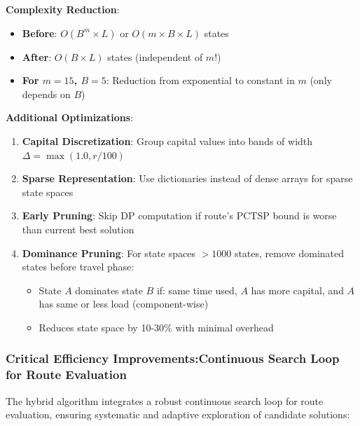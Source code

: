 \documentclass[12pt]{article}
\begin{document}
\textbf{Complexity Reduction}:
\begin{itemize}
    \item \textbf{Before}: $O(B^m \times L)$ or $O(m \times B \times L)$ states
    \item \textbf{After}: $O(B \times L)$ states (independent of $m$!)
    \item \textbf{For $m=15$, $B=5$}: Reduction from exponential to constant in $m$ (only depends on $B$)
\end{itemize}

\textbf{Additional Optimizations}:
\begin{enumerate}
    \item \textbf{Capital Discretization}: Group capital values into bands of width $\Delta = \max(1.0, r / 100)$
    \item \textbf{Sparse Representation}: Use dictionaries instead of dense arrays for sparse state spaces
    \item \textbf{Early Pruning}: Skip DP computation if route's PCTSP bound is worse than current best solution
    \item \textbf{Dominance Pruning}: For state spaces $> 1000$ states, remove dominated states before travel phase:
    \begin{itemize}
        \item State $A$ dominates state $B$ if: same time used, $A$ has more capital, and $A$ has same or less load (component-wise)
        \item Reduces state space by 10-30\% with minimal overhead
    \end{itemize}
\end{enumerate}


\subsubsection{Critical Efficiency Improvements:Continuous Search Loop for Route Evaluation}

The hybrid algorithm integrates a robust continuous search loop for route evaluation, ensuring systematic and adaptive exploration of candidate solutions:
\end{document}
